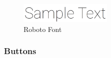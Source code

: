 \begin{figure}[!ht]
    \centering
    \includegraphics[width=0.4\textwidth]{texs/Part2/chapter3/image/roboto.png}
    \caption{Roboto Font}
    \label{fig:roboto}
\end{figure}

\subsubsection{Buttons}











